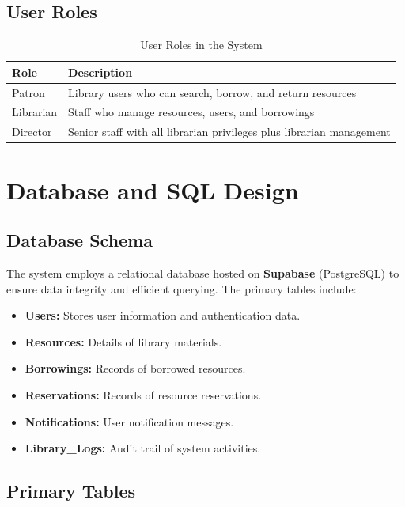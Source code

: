 \documentclass[11pt,a4paper]{article}
\begin{document}
\subsection{User Roles}

\begin{table}[h]
\centering
\begin{tabular}{@{}ll@{}}
\toprule
\textbf{Role} & \textbf{Description} \\
\midrule
Patron & Library users who can search, borrow, and return resources \\
Librarian & Staff who manage resources, users, and borrowings \\
Director & Senior staff with all librarian privileges plus librarian management \\
\bottomrule
\end{tabular}
\caption{User Roles in the System}
\end{table}

\section{Database and SQL Design}

\subsection{Database Schema}

The system employs a relational database hosted on \textbf{Supabase} (PostgreSQL) to ensure data integrity and efficient querying. The primary tables include:

\begin{itemize}
    \item \textbf{Users:} Stores user information and authentication data.
    \item \textbf{Resources:} Details of library materials.
    \item \textbf{Borrowings:} Records of borrowed resources.
    \item \textbf{Reservations:} Records of resource reservations.
    \item \textbf{Notifications:} User notification messages.
    \item \textbf{Library\_Logs:} Audit trail of system activities.
\end{itemize}

\subsection{Primary Tables}
\end{document}
